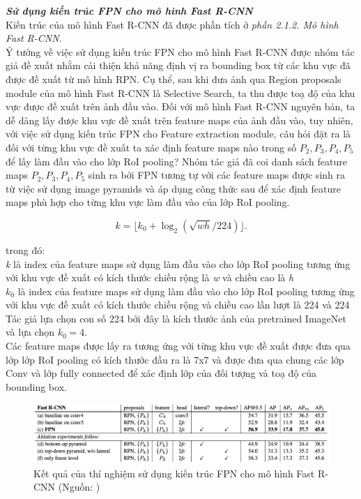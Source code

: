 {    \noindent
    \textbf{\textit{Sử dụng kiến trúc FPN cho mô hình Fast R-CNN}} \\
    Kiến trúc của mô hình Fast R-CNN đã được phần tích ở \textit{phần 2.1.2. Mô hình Fast R-CNN}. \\
    Ý tưởng về việc sử dụng kiến trúc FPN cho mô hình Fast R-CNN được nhóm tác giả đề xuất nhằm cải thiện khả năng định vị ra bounding box từ các khu vực đã được đề xuất từ mô hình RPN.
    Cụ thể, sau khi đưa ảnh qua Region proposals module của mô hình Fast R-CNN là Selective Search, ta thu được toạ độ của khu vực được đề xuất trên ảnh đầu vào.
    Đối với mô hình Fast R-CNN nguyên bản, ta dễ dàng lấy được khu vực đề xuất trên feature maps của ảnh đầu vào, tuy nhiên, với việc sử dụng kiến trúc FPN cho Feature extraction module, câu hỏi đặt ra là đối với từng khu vực đề xuất ta xác định feature maps nào trong số \textit{{${P}_{2}, {P}_{3}, {P}_{4}, {P}_{5}$}} để lấy làm đầu vào cho lớp RoI pooling?
    Nhóm tác giả đã coi danh sách feature maps \textit{{${P}_{2}, {P}_{3}, {P}_{4}, {P}_{5}$}} sinh ra bởi FPN tương tự với các feature maps được sinh ra từ việc sử dụng image pyramids và áp dụng công thức sau để xác định feature maps phù hợp cho từng khu vực làm đầu vào của lớp RoI pooling.

    \begin{equation}
        \label{eq:roi_mapping}
        k = \lfloor k_0 + \log_2(\sqrt{wh} / 224) \rfloor.
    \end{equation}

    trong đó: \\
    \textit{k} là index của feature maps sử dụng làm đầu vào cho lớp RoI pooling tương ứng với khu vực đề xuất có kích thước chiều rộng là \textit{w} và chiều cao là \textit{h} \\
    $k_0$ là index của feature maps sử dụng làm đầu vào cho lớp RoI pooling tương ứng với khu vực đề xuất có kích thước chiều rộng và chiều cao lần lượt là 224 và 224 \\
    Tác giả lựa chọn con số 224 bởi đây là kích thước ảnh của pretrained ImageNet và lựa chọn $k_0 = 4$. \\
    Các feature maps được lấy ra tương ứng với từng khu vực đề xuất được đưa qua lớp lớp RoI pooling có kích thước đầu ra là 7x7 và được đưa qua chung các lớp Conv và lớp fully connected để xác định lớp của đối tượng và toạ độ của bounding box.

    \begin{figure}[H]
        \centering
        \includegraphics[width=12cm] {images/fpn_results_2}
        \caption{Kết quả của thí nghiệm sử dụng kiến trúc FPN cho mô hình Fast R-CNN (Nguồn: \cite{lin2017feature})}
        \label{fig:fpn_results}
    \end{figure}
    
}
